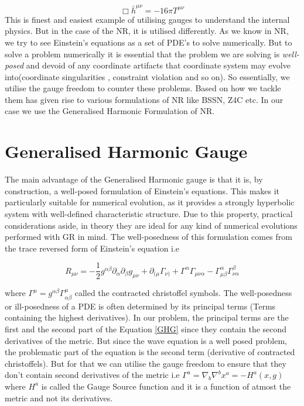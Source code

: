 $$
\Box \bar{h}^{\mu\nu}= -16 \pi T^{\mu \nu}
$$
This is finest and easiest example of utilising gauges to understand the internal physics. But in the case of the NR, it is utilised differently. As
we know in NR, we try to see Einstein's equations as a set of PDE's to solve numerically. But to solve a problem numerically it is essential that the problem we are solving is \textit{well-posed} and devoid of any coordinate artifacts that coordinate system may evolve into(coordinate singularities , constraint violation and so on). So essentially, we utilise the gauge freedom to counter these problems. Based on how we tackle them has given rise to various formulations of NR like BSSN, Z4C etc. In our case we use the Generalised Harmonic Formulation of NR.

\section{Generalised Harmonic Gauge}

The main advantage of the Generalised Harmonic gauge is that it is, by construction, a well-posed formulation of Einstein's equations. This makes it particularly suitable for numerical evolution, as it provides a strongly hyperbolic system with well-defined characteristic structure. Due to this property, practical considerations aside, in theory they are ideal for any kind of numerical evolutions performed with GR in mind.  The well-posedness of this formulation comes from the trace reversed form of Einstein's equation i.e



\begin{equation}
R_{\mu\nu}
= -\frac{1}{2} g^{\alpha\beta} \partial_\alpha \partial_\beta g_{\mu\nu}
+ \partial_{(\mu} \Gamma_{\nu)}
+ \Gamma^\alpha \Gamma_{\mu\nu\alpha}
- \Gamma^\alpha_{\mu\beta} \Gamma^\beta_{\nu\alpha}
\label{GHG}
\end{equation}

where $
\Gamma^\mu = g^{\alpha\beta} \Gamma^\mu_{\alpha\beta}$ called the contracted christoffel symbols. The well-posedness or ill-posedness of a PDE is often determined by its principal terms (Terms containing the highest derivatives). In our problem, the principal terms are the first and the second part of the Equation \ref{GHG} since they contain the second derivatives of the metric. But since the wave equation is a well posed problem, the problematic part of the equation is the second term (derivative of contracted christoffels). But for that we can utilise the gauge freedom to ensure that they don't contain second derivatives of the metric i.e
$\Gamma^a=\nabla_b \nabla^b x^a=-H^a(x,g)$ where $H^a$ is called the Gauge Source function and it is a function of atmost the metric and not its derivatives.

